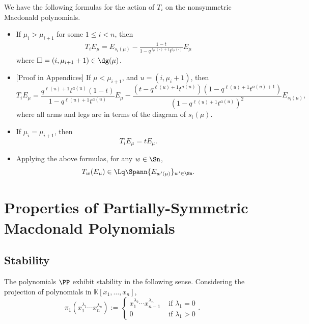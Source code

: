 \begin{lemm}\label{TiFormulas} We have the following formulas for the action of $T_i$ on the nonsymmetric Macdonald polynomials.
\begin{itemize} \item{} If $\mu_{i}>\mu_{i+1}$ for some $1\le i<n$, then
\begin{align}
\label{E:T-on-E-up}
T_i E_\mu = E_{s_i(\mu)}-\frac{1-t}{1-q^{\ell_\mu(\square)+1}t^{a_\mu(\square)}}E_\mu
\end{align}
where $\square=(i,\mu_{i+1}+1)\in\dg(\mu)$.\\

\item\hspace*{0mm}[Proof in Appendices] If $\mu < \mu_{i+1}$, and $u=(i,\mu_{i}+1)$, then
\begin{equation} \label{decreasingT} T_iE_\mu = \frac{q^{\ell(u)+1}t^{a(u)}(1-t)}{1-q^{\ell(u)+1}t^{a(u)}}E_{\mu} - \frac{(t-q^{\ell(u)+1}t^{a(u)})(1-q^{\ell(u)+1}t^{a(u)+1})}{(1-q^{\ell(u)+1}t^{a(u)})^2} E_{s_i(\mu)},\end{equation}
where all arms and legs are in terms of the diagram of $s_i(\mu)$.\\

\item If $\mu_i = \mu_{i+1}$, then
\begin{equation}\label{simpledz} T_i E_\mu = t E_\mu.\end{equation}

\item Applying the above formulas, for any $w\in \Sn$,
\begin{equation}\label{span}
    T_w(E_\mu) \in \Lq \Spann \{ E_{w'(\mu)} \}_{w' \in \Sn}.
\end{equation}

\end{itemize}
\end{lemm}








\section{Properties of Partially-Symmetric Macdonald Polynomials}
\subsection{Stability}
The polynomials $\PP$ exhibit stability in the following sense. Considering the projection of polynomials in $\mathbb{K}[x_1,\dotsc, x_n]$,
\[ \pi_1(x_1^{\lambda_1} \dotsm x_n^{\lambda_n}) := \begin{cases} x_1^{\lambda_2} \dotsm x_{n-1}^{\lambda_n} &\text{ if } \lambda_1=0\\
0 &\text{ if } \lambda_1 > 0\end{cases}. \]

